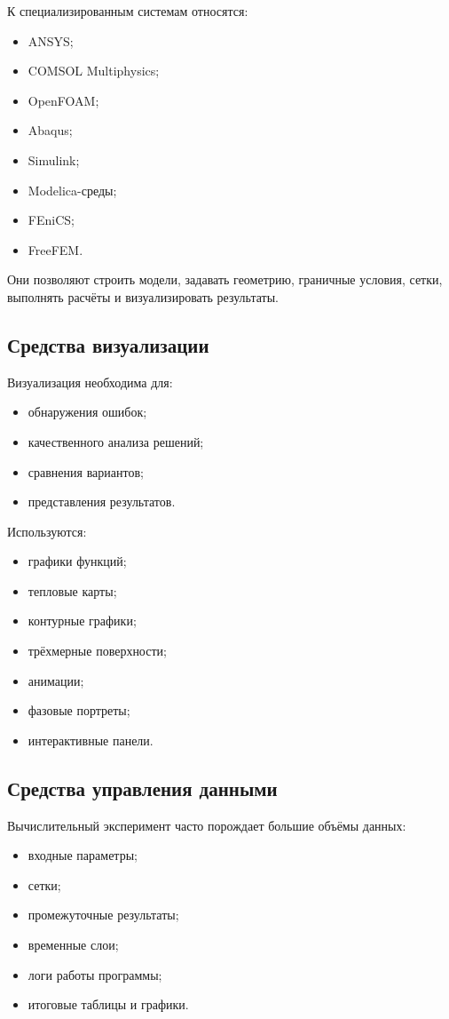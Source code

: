 \documentclass[12pt,a4paper]{article}
\theoremstyle{definition}
\theoremstyle{plain}
\begin{document}
К специализированным системам относятся:
\begin{itemize}
    \item ANSYS;
    \item COMSOL Multiphysics;
    \item OpenFOAM;
    \item Abaqus;
    \item Simulink;
    \item Modelica-среды;
    \item FEniCS;
    \item FreeFEM.
\end{itemize}

Они позволяют строить модели, задавать геометрию, граничные условия, сетки, выполнять расчёты и визуализировать результаты.

\subsection{Средства визуализации}

Визуализация необходима для:
\begin{itemize}
    \item обнаружения ошибок;
    \item качественного анализа решений;
    \item сравнения вариантов;
    \item представления результатов.
\end{itemize}

Используются:
\begin{itemize}
    \item графики функций;
    \item тепловые карты;
    \item контурные графики;
    \item трёхмерные поверхности;
    \item анимации;
    \item фазовые портреты;
    \item интерактивные панели.
\end{itemize}

\subsection{Средства управления данными}

Вычислительный эксперимент часто порождает большие объёмы данных:
\begin{itemize}
    \item входные параметры;
    \item сетки;
    \item промежуточные результаты;
    \item временные слои;
    \item логи работы программы;
    \item итоговые таблицы и графики.
\end{itemize}
\end{document}
